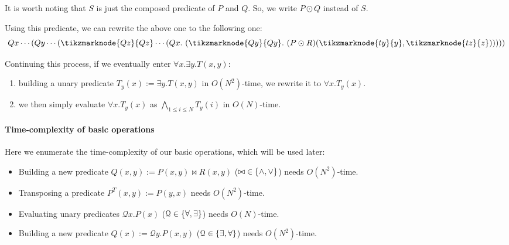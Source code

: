 \documentclass[a4paper,UKenglish,cleveref, autoref, thm-restate]{lipics-v2021}
\begin{document}
It is worth noting that $S$ is just the composed predicate of $P$ and $Q$.
So, we write $P \odot Q$ instead of $S$.

Using this predicate, we can rewrite the above one to the following one:
$$
Qx \cdots
( Qy \cdots
  ( \tikzmarknode{Qz}{Qz} \cdots
    ( Qx.\
      (
        \tikzmarknode{Qy}{Qy}.\ (P \odot R)(\tikzmarknode{ty}{y}, \tikzmarknode{tz}{z})
      )
    )
  )
)
$$


Continuing this process, if we eventually enter $\forall x. \exists y. T(x, y)$:
\begin{enumerate}
\item building a unary predicate $T_y(x) := \exists y. T(x, y)$ in $O(N^2)$-time, we rewrite it to $\forall x. T_y(x)$.
\item we then simply evaluate $\forall x. T_y(x)$ as $\bigwedge_{1 \leq i \leq N} T_y(i)$ in $O(N)$-time.
\end{enumerate}

\paragraph*{Time-complexity of basic operations}

Here we enumerate the time-complexity of our basic operations, which will be used later:
\begin{itemize}
\item Building a new predicate $Q(x, y) := P(x, y) \bowtie R(x, y)$ ($\mathord{\bowtie} \in \{ \land, \lor \}$) needs $O(N^2)$-time.
%
\item Transposing a predicate $P^T(x, y) := P(y, x)$ needs $O(N^2)$-time.
%
\item Evaluating unary predicates $\mathcal{Q} x. P(x)$ ($\mathcal{Q} \in \{\forall, \exists\}$) needs $O(N)$-time.
%
\item Building a new predicate $Q(x) := \mathcal{Q} y. P(x, y)$ ($\mathcal{Q} \in \{\exists, \forall\}$) needs $O(N^2)$-time.
\end{itemize}
\end{document}
